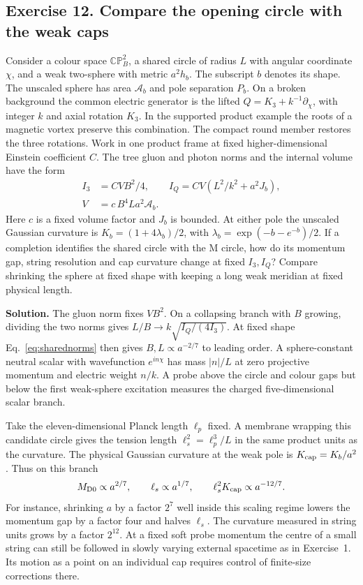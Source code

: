 \documentclass[10pt]{article}
\begin{document}
\subsection{Exercise 12. Compare the opening circle with the weak caps}
Consider a colour space $\mathbb{CP}^2_B$, a shared circle of radius $L$ with angular coordinate $\chi$, and a weak two-sphere with metric $a^2h_b$. The subscript $b$ denotes its shape. The unscaled sphere has area $\mathcal A_b$ and pole separation $P_b$. On a broken background the common electric generator is the lifted $Q=K_3+k^{-1}\partial_\chi$, with integer $k$ and axial rotation $K_3$. In the supported product example the roots of a magnetic vortex preserve this combination. The compact round member restores the three rotations. Work in one product frame at fixed higher-dimensional Einstein coefficient $C$. The tree gluon and photon norms and the internal volume have the form
\begin{equation}
 \begin{aligned}
 I_3&=CV B^2/4,\qquad I_Q=CV(L^2/k^2+a^2J_b),\\
 V&=c\,B^4 L a^2\mathcal A_b .
 \end{aligned}
 \label{eq:sharednorms}
\end{equation}
Here $c$ is a fixed volume factor and $J_b$ is bounded. At either pole the unscaled Gaussian curvature is $K_b=(1+4\lambda_b)/2$, with $\lambda_b=\exp(-b-e^{-b})/2$. If a completion identifies the shared circle with the M circle, how do its momentum gap, string resolution and cap curvature change at fixed $I_3,I_Q$? Compare shrinking the sphere at fixed shape with keeping a long weak meridian at fixed physical length.

\noindent\textbf{Solution.}
The gluon norm fixes $VB^2$. On a collapsing branch with $B$ growing, dividing the two norms gives $L/B\to k\sqrt{I_Q/(4I_3)}$. At fixed shape Eq.~\eqref{eq:sharednorms} then gives $B,L\propto a^{-2/7}$ to leading order. A sphere-constant neutral scalar with wavefunction $e^{in\chi}$ has mass $|n|/L$ at zero projective momentum and electric weight $n/k$. A probe above the circle and colour gaps but below the first weak-sphere excitation measures the charged five-dimensional scalar branch.

Take the eleven-dimensional Planck length $\ell_p$ fixed. A membrane wrapping this candidate circle gives the tension length $\ell_s^2=\ell_p^3/L$ in the same product units as the curvature. The physical Gaussian curvature at the weak pole is $K_{\rm cap}=K_b/a^2$. Thus on this branch
\begin{equation}
 M_{\rm D0}\propto a^{2/7},\qquad
 \ell_s\propto a^{1/7},\qquad
 \ell_s^2 K_{\rm cap}\propto a^{-12/7}.
\end{equation}
For instance, shrinking $a$ by a factor $2^7$ well inside this scaling regime lowers the momentum gap by a factor four and halves $\ell_s$. The curvature measured in string units grows by a factor $2^{12}$. At a fixed soft probe momentum the centre of a small string can still be followed in slowly varying external spacetime as in Exercise~1. Its motion as a point on an individual cap requires control of finite-size corrections there.
\end{document}
